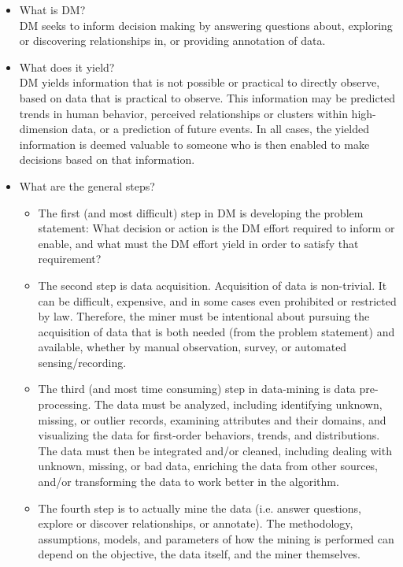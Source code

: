 \documentclass[fleqn,10pt]{SelfArx} %
\begin{document}
\begin{itemize}[noitemsep]

\item What is DM?\\
DM seeks to inform decision making by answering questions about, exploring or discovering relationships in, or providing annotation of data.

\item What does it yield?\\
  DM yields information that is not possible or practical to directly observe, based on data that is practical to observe.  This information may be predicted trends in human behavior, perceived relationships or clusters within high-dimension data, or a prediction of future events.  In all cases, the yielded information is deemed valuable to someone who is then enabled to make decisions based on that information.

\item What are the general steps?  

\begin{itemize}
	
	\item The first (and most difficult) step in DM is developing the problem statement: What decision or action is the DM effort required to inform or enable, and what must the DM effort yield in order to satisfy that requirement?
	
	\item The second step is data acquisition.  Acquisition of data is non-trivial.  It can be difficult, expensive, and in some cases even prohibited or restricted by law.  Therefore, the miner must be intentional about pursuing the acquisition of data that is both needed (from the problem statement) and available, whether by manual observation, survey, or automated sensing/recording.
	
	\item The third (and most time consuming) step in data-mining is data pre-processing.  The data must be analyzed, including identifying unknown, missing, or outlier records, examining attributes and their domains, and visualizing the data for first-order behaviors, trends, and distributions.  The data must then be integrated and/or cleaned, including dealing with unknown, missing, or bad data, enriching the data from other sources, and/or transforming the data to work better in the algorithm.
	
	\item The fourth step is to actually mine the data (i.e. answer questions, explore or discover relationships, or annotate).  The methodology, assumptions, models, and parameters of how the mining is performed can depend on the objective, the data itself, and the miner themselves.
	

\end{itemize}
\end{itemize}
\end{document}
